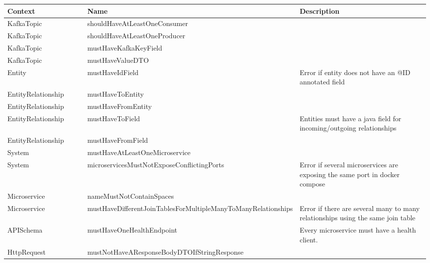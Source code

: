 \documentclass[parskip=full]{article}
\begin{document}
    \begin{table}[h]
        \centering
        \begin{tabular}{|p{0.21\linewidth}|p{0.4\linewidth}|p{0.39\linewidth}|}
            \toprule
            \textbf{Context} & \textbf{Name} & \textbf{Description} \\
            \midrule
            \rowcolor{lightgray}
            KafkaTopic & shouldHaveAtLeastOneConsumer &  \\
            \hline
            \rowcolor{lightgray}
            KafkaTopic & shouldHaveAtLeastOneProducer &  \\
            \hline
            KafkaTopic & mustHaveKafkaKeyField &  \\
            \hline
            KafkaTopic & mustHaveValueDTO &  \\
            \hline
            Entity & mustHaveIdField & Error if entity does not have an @ID annotated field \\
            \hline
            EntityRelationship & mustHaveToEntity &  \\
            \hline
            EntityRelationship & mustHaveFromEntity &  \\
            \hline
            EntityRelationship & mustHaveToField & Entities must have a java field for incoming/outgoing relationships \\
            \hline
            EntityRelationship & mustHaveFromField & \\
            \hline
            System & mustHaveAtLeastOneMicroservice &  \\
            \hline
            System & \hspace{0pt}microservicesMustNotExposeConflictingPorts & Error if several microservices are exposing the same port in docker compose \\
            \hline
            Microservice & nameMustNotContainSpaces &  \\
            \hline
            Microservice & mustHaveDifferentJoinTablesForMultipleMany\-ToManyRelationships & Error if there are several many to many relationships using the same join table \\
            \hline
            APISchema & mustHaveOneHealthEndpoint & Every microservice must have a health client. \\
            \hline
            HttpRequest & \hspace{0pt}mustNotHaveAResponseBodyDTOIfStringResponse &  \\

\end{tabular}
\end{table}
\end{document}
